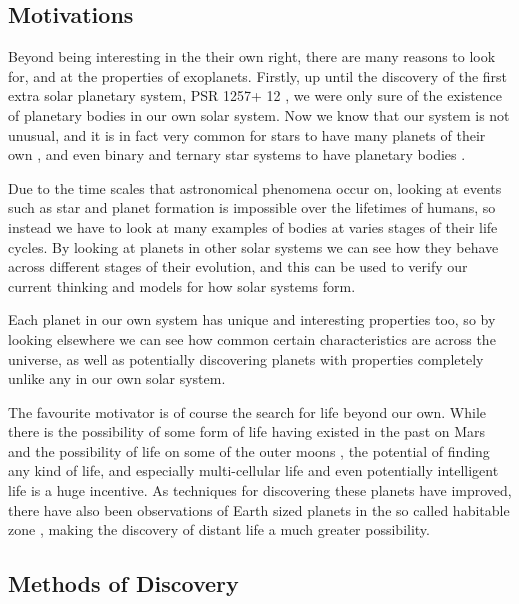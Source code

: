 \subsection{Motivations}

Beyond being interesting in the their own right, there are many reasons to look for, and at the properties of exoplanets. Firstly, up until the discovery of the first extra solar planetary system, PSR 1257+ 12 \parencite{wolszczan1992planetary}, we were only sure of the existence of planetary bodies in our own solar system. Now we know that our system is not unusual, and it is in fact very common for stars to have many planets of their own \parencite{mcarthur2004detection}, and even binary and ternary star systems to have planetary bodies \parencite{marcy2002planet}.

Due to the time scales that astronomical phenomena occur on, looking at events such as star and planet formation is impossible over the lifetimes of humans, so instead we have to look at many examples of bodies at varies stages of their life cycles. By looking at planets in other solar systems we can see how they behave across different stages of their evolution, and this can be used to verify our current thinking and models for how solar systems form.

Each planet in our own system has unique and interesting properties too, so by looking elsewhere we can see how common certain characteristics are across the universe, as well as potentially discovering planets with properties completely unlike any in our own solar system.

The favourite motivator is of course the search for life beyond our own. While there is the possibility of some form of life having existed in the past on Mars \parencite{mckay1996search} and the possibility of life on some of the outer moons \parencite{mckay2005possibilities}, the potential of finding any kind of life, and especially multi-cellular life and even potentially intelligent life is a huge incentive. As techniques for discovering these planets have improved, there have also been observations of Earth sized planets in the so called habitable zone \parencite{wordsworth2011gliese}, making the discovery of distant life a much greater possibility.

\subsection{Methods of Discovery}

